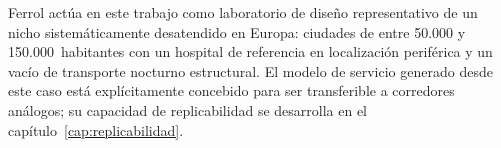 Ferrol actúa en este trabajo como laboratorio de diseño representativo
de un nicho sistemáticamente desatendido en Europa: ciudades de entre
50.000 y 150.000~habitantes con un hospital de referencia en
localización periférica y un vacío de transporte nocturno estructural.
El modelo de servicio generado desde este caso está explícitamente
concebido para ser transferible a corredores análogos; su capacidad de
replicabilidad se desarrolla en el capítulo~\ref{cap:replicabilidad}.



